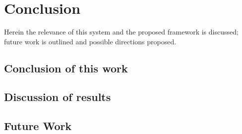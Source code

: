 \chapter{Conclusion}
\label{chapter:Conclusion}

Herein the relevance of this system and the proposed framework is discussed; future work is outlined and possible directions proposed.

\section{Conclusion of this work}

\section{Discussion of results}

\section{Future Work}


